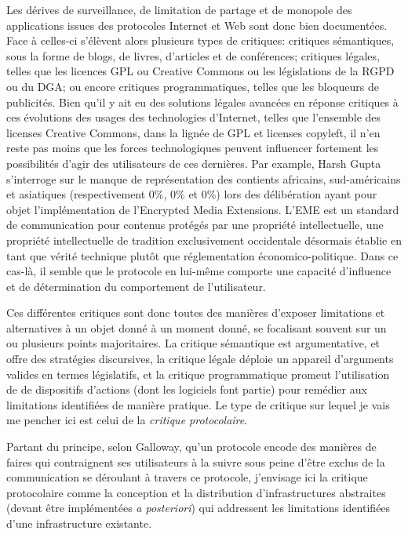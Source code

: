 \documentclass{article}
\begin{document}
Les dérives de surveillance, de limitation de partage et de monopole des applications issues des protocoles Internet et Web sont donc bien documentées. Face à celles-ci s'élèvent alors plusieurs types de critiques: critiques sémantiques, sous la forme de blogs, de livres, d'articles et de conférences; critiques légales, telles que les licences GPL ou Creative Commons ou les législations de la RGPD ou du DGA; ou encore critiques programmatiques, telles que les bloqueurs de publicités. Bien qu'il y ait eu des solutions légales avancées en réponse critiques à ces évolutions des usages des technologies d'Internet, telles que l'ensemble des licenses Creative Commons, dans la lignée de GPL et licenses copyleft, il n'en reste pas moins que les forces technologiques peuvent influencer fortement les possibilités d'agir des utilisateurs de ces dernières. Par example, Harsh Gupta s'interroge sur le manque de représentation des contients africains, sud-américains et asiatiques (respectivement 0\%, 0\% et 0\%) lors des délibération ayant pour objet l'implémentation de l'Encrypted Media Extensions. L'EME est un standard de communication pour contenus protégés par une propriété intellectuelle, une propriété intellectuelle de tradition exclusivement occidentale désormais établie en tant que vérité technique plutôt que réglementation économico-politique. Dans ce cas-là, il semble que le protocole en lui-même comporte une capacité d'influence et de détermination du comportement de l'utilisateur.

Ces différentes critiques sont donc toutes des manières d'exposer limitations et alternatives à un objet donné à un moment donné, se focalisant souvent sur un ou plusieurs points majoritaires. La critique sémantique est argumentative, et offre des stratégies discursives, la critique légale déploie un appareil d'arguments valides en termes législatifs, et la critique programmatique promeut l'utilisation de de dispositifs d'actions (dont les logiciels font partie) pour remédier aux limitations identifiées de manière pratique. Le type de critique sur lequel je vais me pencher ici est celui de la \emph{critique protocolaire}.

Partant du principe, selon Galloway, qu'un protocole encode des manières de faires qui contraignent ses utilisateurs à la suivre sous peine d'être exclus de la communication se déroulant à travers ce protocole\cite{galloway_protocol_2004}, j'envisage ici la critique protocolaire comme la conception et la distribution d'infrastructures abstraites (devant être implémentées \emph{a posteriori}) qui addressent les limitations identifiées d'une infrastructure existante.
\end{document}
